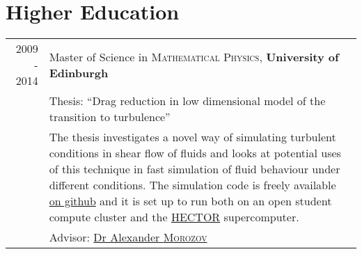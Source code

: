 \documentclass[a4paper,10pt]{article}
\begin{document}
\section{Higher Education}
\begin{tabular}{rp{11cm}}	
 \textsc{2009 - 2014}  & Master of Science in \textsc{Mathematical Physics}, \textbf{University of Edinburgh}\\& Thesis: ``Drag reduction in low dimensional model of the transition to turbulence'' \\&\footnotesize{The thesis investigates a novel way of simulating turbulent conditions in shear flow of fluids and looks at potential uses of this technique in fast simulation of fluid behaviour under different conditions. The simulation code is freely available \href{https://github.com/mkawalec/masters}{on github} and it is set up to run both on an open student compute cluster and the \href{http://www.hector.ac.uk/}{HECTOR} supercomputer.} \\
&\small Advisor: \href{http://www.ph.ed.ac.uk/people/alexander-morozov}{Dr Alexander \textsc{Morozov}}\\
\end{tabular}

\end{document}
